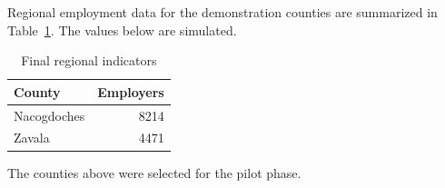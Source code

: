 \documentclass{article}
\newcommand{\region}{PLACEHOLDER}
\newcommand{\headline}{Draft}
\begin{document}
Regional employment data for the demonstration counties are summarized in
Table~\ref{tab:control}. The values below are simulated.

\renewcommand{\region}{Nacogdoches}
\renewcommand{\headline}{Final}

\begin{table}[htbp]
\centering
\caption{\headline{} regional indicators}\label{tab:control}
\begin{tabular}{lr}
\toprule
County & Employers \\
\midrule
\region & 8214 \\
Zavala & 4471 \\
\bottomrule
\end{tabular}
\end{table}

The counties above were selected for the pilot phase.
\end{document}
